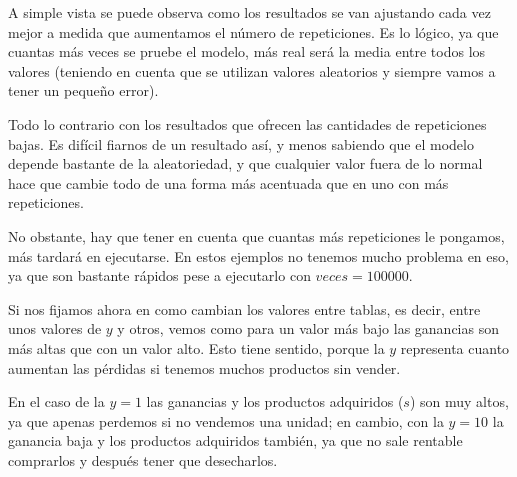 \documentclass[11pt,a4paper]{report}
\begin{document}
A simple vista se puede observa como los resultados se van ajustando cada vez mejor a medida que aumentamos el número de repeticiones. Es lo
lógico, ya que cuantas más veces se pruebe el modelo, más real será la media entre todos los valores (teniendo en cuenta que se utilizan valores
aleatorios y siempre vamos a tener un pequeño error).

Todo lo contrario con los resultados que ofrecen las cantidades de repeticiones bajas. Es difícil fiarnos de un resultado así, y menos sabiendo
que el modelo depende bastante de la aleatoriedad, y que cualquier valor fuera de lo normal hace que cambie todo de una forma más acentuada que
en uno con más repeticiones.

No obstante, hay que tener en cuenta que cuantas más repeticiones le pongamos, más tardará en ejecutarse. En estos ejemplos no tenemos mucho
problema en eso, ya que son bastante rápidos pese a ejecutarlo con $veces=100000$.

Si nos fijamos ahora en como cambian los valores entre tablas, es decir, entre unos valores de $y$ y otros, vemos como para un valor más bajo
las ganancias son más altas que con un valor alto. Esto tiene sentido, porque la $y$ representa cuanto aumentan las pérdidas si tenemos muchos
productos sin vender.

En el caso de la $y=1$ las ganancias y los productos adquiridos ($s$) son muy altos, ya que apenas perdemos si no vendemos una unidad; en cambio,
con la $y=10$ la ganancia baja y los productos adquiridos también, ya que no sale rentable comprarlos y después tener que desecharlos.
\end{document}

